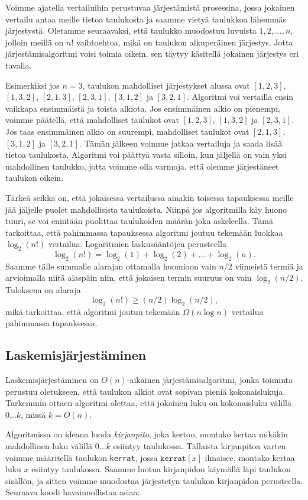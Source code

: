 Voimme ajatella vertailuihin perustuvaa järjestämistä
prosessina, jossa jokainen vertailu antaa meille tietoa
taulukosta ja saamme vietyä taulukkoa lähemmäs järjestystä.
Oletamme seuraavaksi, että taulukko muodostuu luvuista
$1,2,\dots,n$, jolloin meillä on $n!$ vaihtoehtoa, mikä
on taulukon alkuperäinen järjestys.
Jotta järjestämisalgoritmi voisi toimia oikein,
sen täytyy käsitellä jokainen järjestys eri tavalla.

Esimerkiksi jos $n=3$, taulukon mahdolliset järjestykset alussa ovat
$[1,2,3]$, $[1,3,2]$, $[2,1,3]$, $[2,3,1]$, $[3,1,2]$ ja $[3,2,1]$.
Algoritmi voi vertailla ensin vaikkapa ensimmäistä ja toista alkiota.
Jos ensimmäinen alkio on pienempi, voimme päätellä,
että mahdolliset taulukot ovat $[1,2,3]$, $[1,3,2]$ ja $[2,3,1]$.
Jos taas ensimmäinen alkio on suurempi,
mahdolliset taulukot ovat $[2,1,3]$, $[3,1,2]$ ja $[3,2,1]$.
Tämän jälkeen voimme jatkaa vertailuja ja saada lisää tietoa taulukosta.
Algoritmi voi päättyä vasta silloin, kun jäljellä on vain yksi
mahdollinen taulukko, jotta voimme olla varmoja, että olemme
järjestäneet taulukon oikein.

Tärkeä seikka on, että jokaisessa vertailussa ainakin toisessa
tapauksessa meille jää jäljelle puolet mahdollisista taulukoista.
Niinpä jos algoritmilla käy huono tuuri, se voi enintään puolittaa
taulukoiden määrän joka askeleella.
Tämä tarkoittaa, että pahimmassa tapauksessa algoritmi joutuu
tekemään luokkaa $\log_2(n!)$ vertailua.
Logaritmien laskusääntöjen perusteella
\[
\log_2(n!) = \log_2(1)+\log_2(2)+\dots+\log_2(n).
\]
Saamme tälle summalle alarajan ottamalla huomioon vain
$n/2$ viimeistä termiä ja arvioimalla niitä alaspäin niin, 
että jokaisen termin suuruus on vain $\log_2(n/2)$. Tuloksena on alaraja
\[
\log_2(n!) \ge (n/2) \log_2(n/2),
\]
mikä tarkoittaa, että algoritmi joutuu
tekemään $\Omega(n \log n)$ vertailua pahimmassa tapauksessa.

\subsection{Laskemisjärjestäminen}

Laskemisjärjestäminen on $O(n)$-aikainen järjestämisalgoritmi,
jonka toiminta perustuu oletukseen, että taulukon alkiot
ovat sopivan pieniä kokonaislukuja.
Tarkemmin ottaen algoritmi olettaa, että jokainen luku on
kokonaisluku välillä $0 \dots k$, missä $k=O(n)$.

Algoritmissa on ideana luoda \emph{kirjanpito}, joka kertoo,
montako kertaa mikäkin mahdollinen luku välillä $0 \dots k$
esiintyy taulukossa.
Tällaista kirjanpitoa varten voimme määritellä taulukon
\texttt{kerrat}, jossa $\texttt{kerrat}[x]$ ilmaisee,
montako kertaa luku $x$ esiintyy taulukossa.
Saamme luotua kirjanpidon käymällä läpi taulukon sisällön,
ja sitten voimme muodostaa järjestetyn taulukon
kirjanpidon perusteella.
Seuraava koodi havainnollistaa asiaa:

